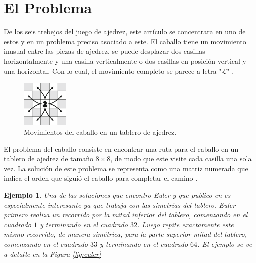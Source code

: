 \documentclass[journal, 10pt]{IEEEtran}
\newtheorem{example}{Ejemplo}
\begin{document}

\section{El Problema}
De los seis trebejos del juego de ajedrez, este art\'iculo se concentrara en uno de estos y en un problema preciso asociado a este. El caballo tiene un movimiento inusual entre las piezas de ajedrez, se puede desplazar dos casillas horizontalmente y una casilla verticalmente o dos casillas en posición vertical y una horizontal. Con lo cual, el movimiento completo se parece a letra "$\mathcal{L}$"  \cite{Uehara:2019}.

\begin{figure}[h]

\centering
\includegraphics[width=0.2\textwidth]{figures/k_moves.png}
\caption{Movimientos del caballo en un tablero de ajedrez.}
\label{fig:moves}

\end{figure}

El problema del caballo consiste en encontrar una ruta para el caballo en un tablero de ajedrez de tamaño $8 \times 8$, de modo que este visite cada casilla una sola vez. La soluci\'on de este problema se representa como una matriz numerada que indica el orden que sigui\'o el caballo para completar el camino \cite{Kopec:2016}.

\begin{example}
	Una de las soluciones que encontro Euler y que publico en \cite{Euler:1759} es especialmente interesante ya que trabaja con las simetr\'ias del tablero. Euler primero realiza un recorrido  por la mitad inferior del tablero, comenzando en el cuadrado $1$ y terminando en el cuadrado $32$. Luego repite exactamente este mismo recorrido, de manera sim\'etrica, para la parte superior mitad del tablero, comenzando en el cuadrado $33$ y terminando en el cuadrado $64$. El ejemplo se ve a detalle en la \textit{Figura \ref{fig:euler}} 
\end{example}
\end{document}
